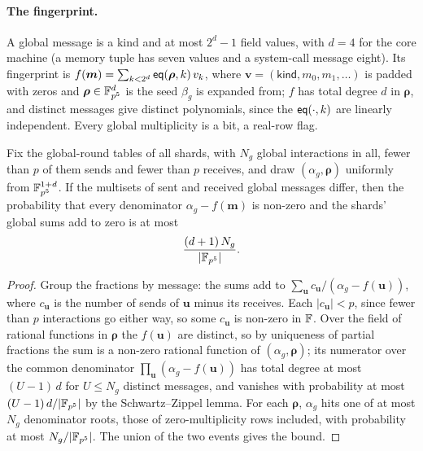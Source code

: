 \paragraph{The fingerprint.} A global message is a kind and at most $2^d - 1$ field values, with $d = 4$ for the core machine (a memory tuple has seven values and a system-call message eight). Its fingerprint is $f(\bm m) = \sum_{k < 2^d} \mathsf{eq}(\bm\rho, k)\, v_k$, where $\bm v = (\mathsf{kind}, m_0, m_1, \dots)$ is padded with zeros and $\bm\rho \in \mathbb{F}_{p^5}^d$ is the seed $\beta_g$ is expanded from; $f$ has total degree $d$ in $\bm\rho$, and distinct messages give distinct polynomials, since the $\mathsf{eq}(\cdot, k)$ are linearly independent. Every global multiplicity is a bit, a real-row flag.

\begin{lemma}
\label{lem:global}
Fix the global-round tables of all shards, with $N_g$ global interactions in all, fewer than $p$ of them sends and fewer than $p$ receives, and draw $(\alpha_g, \bm\rho)$ uniformly from $\mathbb{F}_{p^5}^{1+d}$. If the multisets of sent and received global messages differ, then the probability that every denominator $\alpha_g - f(\bm m)$ is non-zero and the shards' global sums add to zero is at most
\[
  \frac{(d+1)\, N_g}{|\mathbb{F}_{p^5}|}.
\]
\end{lemma}
\begin{proof}
Group the fractions by message: the sums add to $\sum_{\bm u} c_{\bm u}/(\alpha_g - f(\bm u))$, where $c_{\bm u}$ is the number of sends of $\bm u$ minus its receives. Each $|c_{\bm u}| < p$, since fewer than $p$ interactions go either way, so some $c_{\bm u}$ is non-zero in $\mathbb{F}$. Over the field of rational functions in $\bm\rho$ the $f(\bm u)$ are distinct, so by uniqueness of partial fractions the sum is a non-zero rational function of $(\alpha_g, \bm\rho)$; its numerator over the common denominator $\prod_{\bm u}(\alpha_g - f(\bm u))$ has total degree at most $(U-1)\,d$ for $U \le N_g$ distinct messages, and vanishes with probability at most $(U-1)\,d/|\mathbb{F}_{p^5}|$ by the Schwartz--Zippel lemma. For each $\bm\rho$, $\alpha_g$ hits one of at most $N_g$ denominator roots, those of zero-multiplicity rows included, with probability at most $N_g/|\mathbb{F}_{p^5}|$. The union of the two events gives the bound.
\end{proof}

